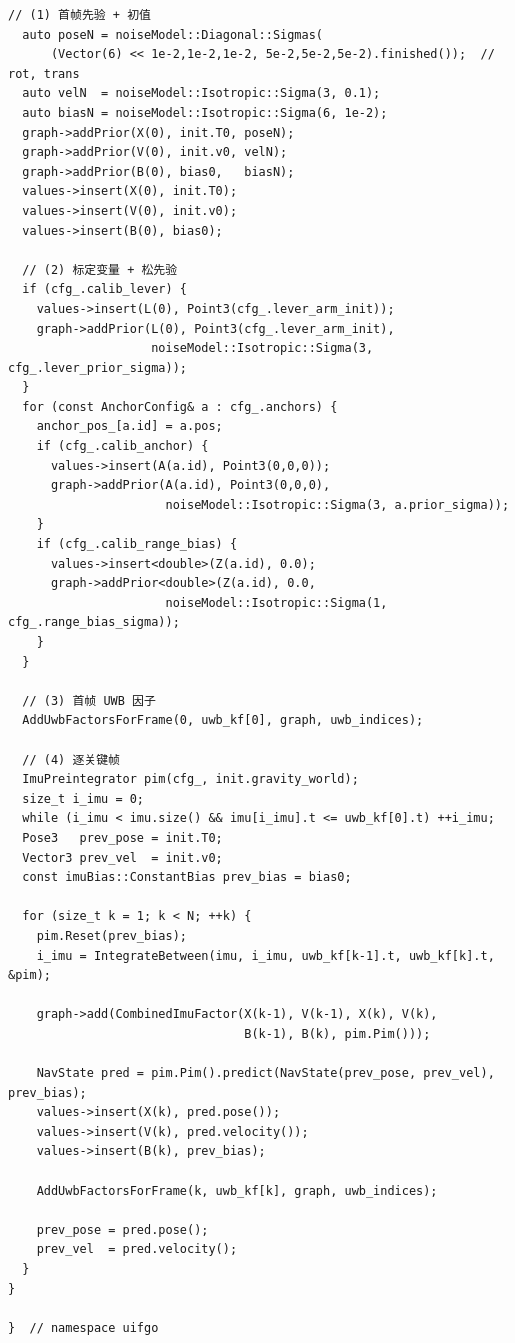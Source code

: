 \documentclass[11pt,a4paper]{report}
\begin{document}
\begin{lstlisting}[style=cpp]
  // (1) 首帧先验 + 初值
  auto poseN = noiseModel::Diagonal::Sigmas(
      (Vector(6) << 1e-2,1e-2,1e-2, 5e-2,5e-2,5e-2).finished());  // rot, trans
  auto velN  = noiseModel::Isotropic::Sigma(3, 0.1);
  auto biasN = noiseModel::Isotropic::Sigma(6, 1e-2);
  graph->addPrior(X(0), init.T0, poseN);
  graph->addPrior(V(0), init.v0, velN);
  graph->addPrior(B(0), bias0,   biasN);
  values->insert(X(0), init.T0);
  values->insert(V(0), init.v0);
  values->insert(B(0), bias0);

  // (2) 标定变量 + 松先验
  if (cfg_.calib_lever) {
    values->insert(L(0), Point3(cfg_.lever_arm_init));
    graph->addPrior(L(0), Point3(cfg_.lever_arm_init),
                    noiseModel::Isotropic::Sigma(3, cfg_.lever_prior_sigma));
  }
  for (const AnchorConfig& a : cfg_.anchors) {
    anchor_pos_[a.id] = a.pos;
    if (cfg_.calib_anchor) {
      values->insert(A(a.id), Point3(0,0,0));
      graph->addPrior(A(a.id), Point3(0,0,0),
                      noiseModel::Isotropic::Sigma(3, a.prior_sigma));
    }
    if (cfg_.calib_range_bias) {
      values->insert<double>(Z(a.id), 0.0);
      graph->addPrior<double>(Z(a.id), 0.0,
                      noiseModel::Isotropic::Sigma(1, cfg_.range_bias_sigma));
    }
  }

  // (3) 首帧 UWB 因子
  AddUwbFactorsForFrame(0, uwb_kf[0], graph, uwb_indices);

  // (4) 逐关键帧
  ImuPreintegrator pim(cfg_, init.gravity_world);
  size_t i_imu = 0;
  while (i_imu < imu.size() && imu[i_imu].t <= uwb_kf[0].t) ++i_imu;
  Pose3   prev_pose = init.T0;
  Vector3 prev_vel  = init.v0;
  const imuBias::ConstantBias prev_bias = bias0;

  for (size_t k = 1; k < N; ++k) {
    pim.Reset(prev_bias);
    i_imu = IntegrateBetween(imu, i_imu, uwb_kf[k-1].t, uwb_kf[k].t, &pim);

    graph->add(CombinedImuFactor(X(k-1), V(k-1), X(k), V(k),
                                 B(k-1), B(k), pim.Pim()));

    NavState pred = pim.Pim().predict(NavState(prev_pose, prev_vel), prev_bias);
    values->insert(X(k), pred.pose());
    values->insert(V(k), pred.velocity());
    values->insert(B(k), prev_bias);

    AddUwbFactorsForFrame(k, uwb_kf[k], graph, uwb_indices);

    prev_pose = pred.pose();
    prev_vel  = pred.velocity();
  }
}

}  // namespace uifgo
\end{lstlisting}
\end{document}

